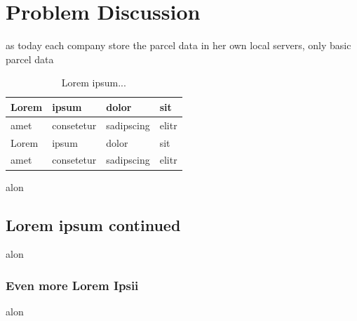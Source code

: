 \section{Problem Discussion}

as today each company store the parcel data in her own local servers, only basic parcel data  

\begin{table}[!ht]
	\small
	\centering
	\begin{tabular}{|l|l|l|l|}
		\hline
		Lorem & ipsum & dolor & sit \\
		\hline
		amet & consetetur & sadipscing & elitr \\
		\hline
		Lorem & ipsum & dolor & sit \\
		\hline
		amet & consetetur & sadipscing & elitr \\
		\hline
	\end{tabular}
	\caption{Lorem ipsum...}
\end{table}

alon

\subsection{Lorem ipsum continued}

alon

\subsubsection{Even more Lorem Ipsii}

alon
